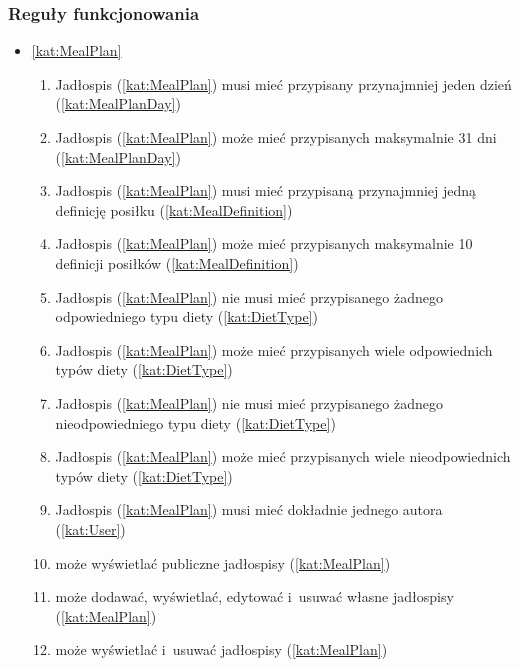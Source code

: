 \subsubsection{Reguły funkcjonowania}\label{subsubsec:database:mealplans:functionalRules}

\begin{itemize}[label={\textbf{Reguły dla}}, wide, labelwidth=!, labelindent=0pt]
    \setlength\itemsep{1.75em}
    \item\ref{kat:MealPlan}\mynobreakpar
    \begin{enumerate}[label={\textbf{REG/3/\protect\twodigits{\arabic{enumi}}}}, wide, labelwidth=!, align=left, leftmargin=3cm]
        \item Jadłospis (\ref{kat:MealPlan}) musi mieć przypisany przynajmniej jeden dzień (\ref{kat:MealPlanDay})
        \item Jadłospis (\ref{kat:MealPlan}) może mieć przypisanych maksymalnie 31 dni (\ref{kat:MealPlanDay})
        \item Jadłospis (\ref{kat:MealPlan}) musi mieć przypisaną przynajmniej jedną definicję posiłku (\ref{kat:MealDefinition})
        \item Jadłospis (\ref{kat:MealPlan}) może mieć przypisanych maksymalnie 10 definicji posiłków (\ref{kat:MealDefinition})
        \item Jadłospis (\ref{kat:MealPlan}) nie musi mieć przypisanego żadnego odpowiedniego typu diety (\ref{kat:DietType})
        \item Jadłospis (\ref{kat:MealPlan}) może mieć przypisanych wiele odpowiednich typów diety (\ref{kat:DietType})
        \item Jadłospis (\ref{kat:MealPlan}) nie musi mieć przypisanego żadnego nieodpowiedniego typu diety (\ref{kat:DietType})
        \item Jadłospis (\ref{kat:MealPlan}) może mieć przypisanych wiele nieodpowiednich typów diety (\ref{kat:DietType})
        \item Jadłospis (\ref{kat:MealPlan}) musi mieć dokładnie jednego autora (\ref{kat:User})
        \item {} może wyświetlać publiczne jadłospisy (\ref{kat:MealPlan})
        \item {} może dodawać, wyświetlać, edytować i~usuwać własne jadłospisy (\ref{kat:MealPlan})
        \item {} może wyświetlać i~usuwać jadłospisy (\ref{kat:MealPlan})
    \end{enumerate}

\end{itemize}
